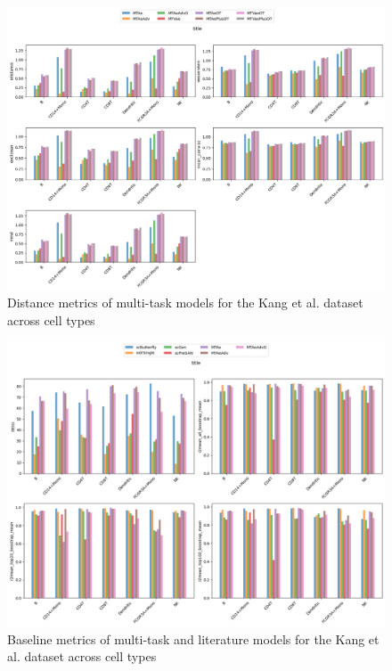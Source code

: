 \documentclass[12pt, a4paper]{article}
\begin{document}
\begin{figure}[h!]
    \centering
    \includegraphics[width=.85\textwidth]{multi_task_benchmarking_cell_type_distance_metrics_pbmc.png}
    \caption{Distance metrics of multi-task models for the Kang et al. \cite{kanaGenerativeModelingSinglecell2023} dataset across cell types}
\end{figure}

\begin{figure}[h!]
    \centering
    \includegraphics[width=.85\textwidth]{selected_benchmarking_cell_type_baseline_metrics_pbmc.png}
    \caption{Baseline metrics of multi-task and literature models for the Kang et al. \cite{kanaGenerativeModelingSinglecell2023} dataset across cell types}
    \label{fig:selected_pbmc_baseline}
\end{figure}
\end{document}
